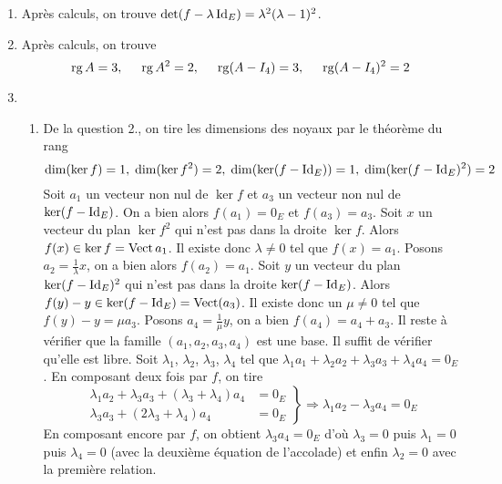 \begin{enumerate}
 \item Après calculs, on trouve $\det(f-\lambda \operatorname{Id}_E)= \lambda^2(\lambda-1)^2$.

 \item Après calculs, on trouve
\begin{displaymath}
 \operatorname{rg} A= 3,\hspace{0.5cm}\operatorname{rg} A^2 = 2,\hspace{0.5cm}\operatorname{rg} (A-I_4) = 3,\hspace{0.5cm}\operatorname{rg} (A-I_4)^2 = 2
\end{displaymath}

 \item
\begin{enumerate}
 \item De la question 2., on tire les dimensions des noyaux par le théorème du rang
\begin{displaymath}
 \dim(\ker f) = 1,\; \dim(\ker f^2) =2, \; \dim(\ker (f-\operatorname{Id}_E)) =1, \; \dim(\ker (f-\operatorname{Id}_E)^2) =2
\end{displaymath}
Soit $a_1$ un vecteur non nul de $\ker f$ et $a_3$ un vecteur non nul de $\ker(f-\operatorname{Id}_E)$. On a bien alors $f(a_1)=0_E$ et $f(a_3)=a_3$.\newline
Soit $x$ un vecteur du plan $\ker f^2$ qui n'est pas dans la droite $\ker f$. Alors $f(x)\in \ker f= \operatorname{Vect} a_1$. Il existe donc $\lambda\neq 0$ tel que $f(x)=a_1$. Posons $a_2=\frac{1}{\lambda}x$, on a bien alors $f(a_2)=a_1$.\newline
Soit $y$ un vecteur du plan $\ker(f-\operatorname{Id}_E)^2$ qui n'est pas dans la droite $\ker (f-\operatorname{Id}_E)$. Alors $f(y)-y\in \ker(f-\operatorname{Id}_E)=\operatorname{Vect}(a_3)$. Il existe donc un $\mu\neq 0$ tel que $f(y)-y=\mu a_3$. Posons $a_4=\frac{1}{\mu}y$, on a bien
$f(a_4)=a_4+a_3$.\newline
Il reste à vérifier que la famille $(a_1,a_2,a_3,a_4)$ est une base. Il suffit de vérifier qu'elle est libre.
Soit $\lambda_1$, $\lambda_2$, $\lambda_3$, $\lambda_4$ tel que $\lambda_1a_1 + \lambda_2 a_2+ \lambda_3a_3 + \lambda_4 a_4=0_E$.\newline
En composant deux fois par $f$, on tire
\begin{displaymath}
\left. 
\begin{aligned}
\lambda_1a_2 + \lambda_3a_3 + (\lambda_3 + \lambda_4)a_4 &= 0_E \\
\lambda_3a_3 + (2\lambda_3 + \lambda_4)a_4 &= 0_E
\end{aligned}
\right\rbrace 
\Rightarrow \lambda_1 a_2 - \lambda_3 a_4 = 0_E
\end{displaymath}
En composant encore par $f$, on obtient $\lambda_3 a_4 = 0_E$ d'où $\lambda_3=0$ puis $\lambda_1=0$ puis $\lambda_4=0$ (avec la deuxième équation de l'accolade) et enfin $\lambda_2=0$ avec la première relation.


\end{enumerate}
\end{enumerate}
